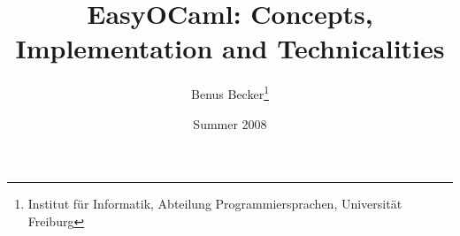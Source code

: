 \documentclass[11pt,a4paper,english]{report}
\title{EasyOCaml: Concepts, Implementation and Technicalities}
\author{Benus Becker\protect\footnote{Institut f\"ur Informatik, Abteilung Programmiersprachen, Universit\"at Freiburg}}
\date{Summer 2008}
\begin{document}






\begin{appendix}
  
  
  
  
\end{appendix}
\end{document}
